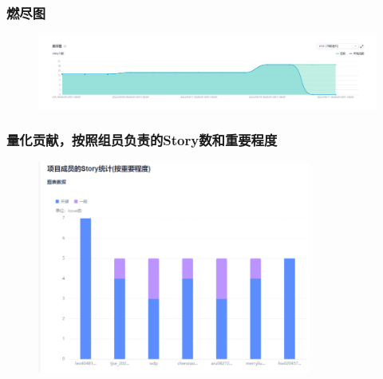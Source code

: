 \begin{frame}
    \frametitle{燃尽图}
    \begin{figure}[H]
        \centering
        \includegraphics[width=\textwidth]{contents/figure/burnout.png}
    \end{figure}
\end{frame}

\begin{frame}
    \frametitle{量化贡献，按照组员负责的Story数和重要程度}
    \begin{figure}[H]
        \centering
        \includegraphics[width=0.8\textwidth]{contents/figure/contribution.png}
    \end{figure}
\end{frame}
